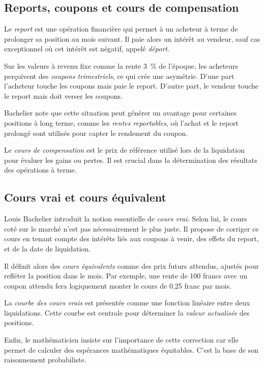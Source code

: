 \documentclass[12pt,a4paper]{article}
\begin{document}
\subsection{Reports, coupons et cours de compensation}

Le \textit{report} est une opération financière qui permet à un acheteur à terme de prolonger sa position au mois suivant. Il paie alors un intérêt au vendeur, sauf cas exceptionnel où cet intérêt est négatif, appelé \textit{déport}.

Sur les valeurs à revenu fixe comme la rente 3~\% de l’époque, les acheteurs perçoivent des \textit{coupons trimestriels}, ce qui crée une asymétrie. D'une part l’acheteur touche les coupons mais paie le report. D'autre part, le vendeur touche le report mais doit verser les coupons.

Bachelier note que cette situation peut générer un avantage pour certaines positions à long terme, comme les \textit{rentes reportables}, où l’achat et le report prolongé sont utilisés pour capter le rendement du coupon.

Le \textit{cours de compensation} est le prix de référence utilisé lors de la liquidation pour évaluer les gains ou pertes. Il est crucial dans la détermination des résultats des opérations à terme.

\subsection{Cours vrai et cours équivalent}

Louis Bachelier introduit la notion essentielle de \textit{cours vrai}. Selon lui, le cours coté sur le marché n’est pas nécessairement le plus juste. Il propose de corriger ce cours en tenant compte des intérêts liés aux coupons à venir, des effets du report, et de la date de liquidation.

Il définit alors des \textit{cours équivalents} comme des prix futurs attendus, ajustés pour refléter la position dans le mois. Par exemple, une rente de 100 francs avec un coupon attendu fera logiquement monter le cours de 0{,}25 franc par mois.

La \textit{courbe des cours vrais} est présentée comme une fonction linéaire entre deux liquidations. Cette courbe est centrale pour déterminer la \textit{valeur actualisée} des positions.

Enfin, le mathématicien insiste sur l'importance de cette correction car elle permet de calculer des espérances mathématiques équitables. C'est la base de son raisonnement probabiliste.
\end{document}
